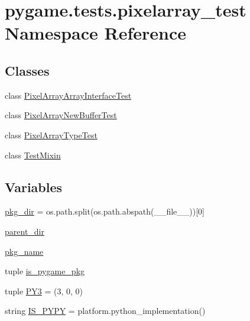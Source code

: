 \hypertarget{namespacepygame_1_1tests_1_1pixelarray__test}{}\section{pygame.\+tests.\+pixelarray\+\_\+test Namespace Reference}
\label{namespacepygame_1_1tests_1_1pixelarray__test}
\subsection*{Classes}
\begin{DoxyCompactItemize}
\item 
class \hyperlink{classpygame_1_1tests_1_1pixelarray__test_1_1_pixel_array_array_interface_test}{Pixel\+Array\+Array\+Interface\+Test}
\item 
class \hyperlink{classpygame_1_1tests_1_1pixelarray__test_1_1_pixel_array_new_buffer_test}{Pixel\+Array\+New\+Buffer\+Test}
\item 
class \hyperlink{classpygame_1_1tests_1_1pixelarray__test_1_1_pixel_array_type_test}{Pixel\+Array\+Type\+Test}
\item 
class \hyperlink{classpygame_1_1tests_1_1pixelarray__test_1_1_test_mixin}{Test\+Mixin}
\end{DoxyCompactItemize}
\subsection*{Variables}
\begin{DoxyCompactItemize}
\item 
\hyperlink{namespacepygame_1_1tests_1_1pixelarray__test_a7149db02e07c797ac5338f74e65df154}{pkg\+\_\+dir} = os.\+path.\+split(os.\+path.\+abspath(\+\_\+\+\_\+file\+\_\+\+\_\+))\mbox{[}0\mbox{]}
\item 
\hyperlink{namespacepygame_1_1tests_1_1pixelarray__test_adc40833a490b92e7109fb2b9ba8ae608}{parent\+\_\+dir}
\item 
\hyperlink{namespacepygame_1_1tests_1_1pixelarray__test_a430fc2d3113c4db330e226c981869232}{pkg\+\_\+name}
\item 
tuple \hyperlink{namespacepygame_1_1tests_1_1pixelarray__test_a1fa95ca7ba55aeda219cc77171e02d32}{is\+\_\+pygame\+\_\+pkg}
\item 
tuple \hyperlink{namespacepygame_1_1tests_1_1pixelarray__test_a62c5e37a082b4dacf676b5f995b0bf39}{P\+Y3} = (3, 0, 0)
\item 
string \hyperlink{namespacepygame_1_1tests_1_1pixelarray__test_af35eb035c74e58a0c9bbcd1da9809fe8}{I\+S\+\_\+\+P\+Y\+PY} = platform.\+python\+\_\+implementation()
\end{DoxyCompactItemize}


